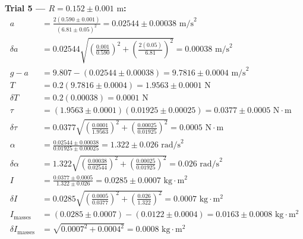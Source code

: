 \documentclass[11pt]{article}
\begin{document}
\textbf{Trial 5 — $R = 0.152 \pm 0.001\text{ m}$:}
\begin{align*}
a &= \frac{2(0.590 \pm 0.001)}{(6.81 \pm 0.05)^2} = 0.02544 \pm 0.00038\text{ m/s}^2 \\
\delta a &= 0.02544\sqrt{\left(\frac{0.001}{0.590}\right)^2 + \left(\frac{2(0.05)}{6.81}\right)^2} = 0.00038\text{ m/s}^2 \\
g - a &= 9.807 - (0.02544 \pm 0.00038) = 9.7816 \pm 0.0004\text{ m/s}^2 \\
T &= 0.2(9.7816 \pm 0.0004) = 1.9563 \pm 0.0001\text{ N} \\
\delta T &= 0.2(0.00038) = 0.0001\text{ N} \\
\tau &= (1.9563 \pm 0.0001)(0.01925 \pm 0.00025) = 0.0377 \pm 0.0005\text{ N}\cdot\text{m} \\
\delta\tau &= 0.0377\sqrt{\left(\frac{0.0001}{1.9563}\right)^2 + \left(\frac{0.00025}{0.01925}\right)^2} = 0.0005\text{ N}\cdot\text{m} \\
\alpha &= \frac{0.02544 \pm 0.00038}{0.01925 \pm 0.00025} = 1.322 \pm 0.026\text{ rad/s}^2 \\
\delta\alpha &= 1.322\sqrt{\left(\frac{0.00038}{0.02544}\right)^2 + \left(\frac{0.00025}{0.01925}\right)^2} = 0.026\text{ rad/s}^2 \\
I &= \frac{0.0377 \pm 0.0005}{1.322 \pm 0.026} = 0.0285 \pm 0.0007\text{ kg}\cdot\text{m}^2 \\
\delta I &= 0.0285\sqrt{\left(\frac{0.0005}{0.0377}\right)^2 + \left(\frac{0.026}{1.322}\right)^2} = 0.0007\text{ kg}\cdot\text{m}^2 \\
I_{\text{masses}} &= (0.0285 \pm 0.0007) - (0.0122 \pm 0.0004) = 0.0163 \pm 0.0008\text{ kg}\cdot\text{m}^2 \\
\delta I_{\text{masses}} &= \sqrt{0.0007^2 + 0.0004^2} = 0.0008\text{ kg}\cdot\text{m}^2
\end{align*}
\end{document}
